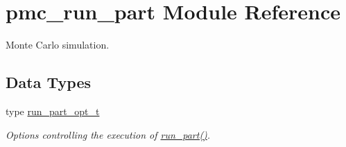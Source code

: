 \hypertarget{namespacepmc__run__part}{}\section{pmc\+\_\+run\+\_\+part Module Reference}
\label{namespacepmc__run__part}


Monte Carlo simulation.  


\subsection*{Data Types}
\begin{DoxyCompactItemize}
\item 
type \mbox{\hyperlink{structpmc__run__part_1_1run__part__opt__t}{run\+\_\+part\+\_\+opt\+\_\+t}}
\begin{DoxyCompactList}\small\item\em Options controlling the execution of \mbox{\hyperlink{namespacepmc__run__part_af2f5c765b1f86663d85b7ca882325eca}{run\+\_\+part()}}. \end{DoxyCompactList}\end{DoxyCompactItemize}
